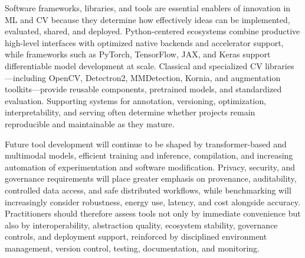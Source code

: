 \documentclass{article}
\begin{document}
Software frameworks, libraries, and tools are essential enablers of innovation in ML and CV because they determine how effectively ideas can be implemented, evaluated, shared, and deployed. Python-centered ecosystems combine productive high-level interfaces with optimized native backends and accelerator support, while frameworks such as PyTorch, TensorFlow, JAX, and Keras support differentiable model development at scale. Classical and specialized CV libraries---including OpenCV, Detectron2, MMDetection, Kornia, and augmentation toolkits---provide reusable components, pretrained models, and standardized evaluation. Supporting systems for annotation, versioning, optimization, interpretability, and serving often determine whether projects remain reproducible and maintainable as they mature.

Future tool development will continue to be shaped by transformer-based and multimodal models, efficient training and inference, compilation, and increasing automation of experimentation and software modification. Privacy, security, and governance requirements will place greater emphasis on provenance, auditability, controlled data access, and safe distributed workflows, while benchmarking will increasingly consider robustness, energy use, latency, and cost alongside accuracy. Practitioners should therefore assess tools not only by immediate convenience but also by interoperability, abstraction quality, ecosystem stability, governance controls, and deployment support, reinforced by disciplined environment management, version control, testing, documentation, and monitoring.




\clearpage






\end{document}
